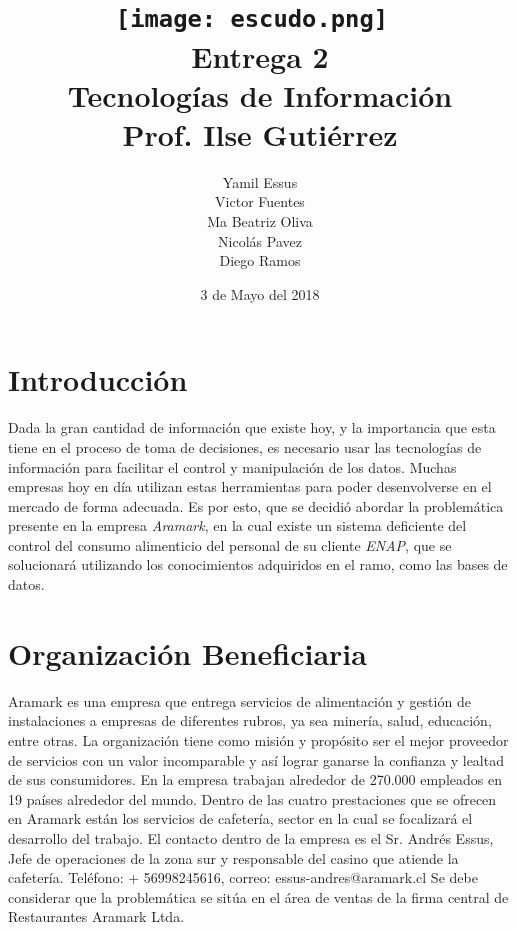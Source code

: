 \documentclass[12pt]{article}
\title{\texttt{[image: escudo.png]}~ 
\\[1cm]Entrega 2\\Tecnolog\'ias de Informaci\'on\\Prof. Ilse Guti\'errez}
\author{Yamil Essus\\Victor Fuentes\\ Ma Beatriz Oliva\\Nicol\'as Pavez\\Diego Ramos}
\date{3 de Mayo del 2018}
\begin{document}
	\maketitle
	\newpage
	\section{Introducci\'on}
	Dada la gran cantidad de informaci\'on que existe hoy, y la importancia que esta tiene en el proceso de toma de decisiones, es necesario usar las tecnolog\'ias de informaci\'on para facilitar el control y manipulaci\'on de los datos. Muchas empresas hoy en d\'ia utilizan estas herramientas para poder desenvolverse en el mercado de forma adecuada. Es por esto, que se decidi\'o abordar la problem\'atica presente en la empresa \textit{Aramark}, en la cual existe un sistema deficiente del control del consumo alimenticio del personal de su cliente \textit{ENAP}, que se solucionar\'a utilizando los conocimientos adquiridos en el ramo, como las bases de datos. 
	\section{Organizaci\'on Beneficiaria}
	Aramark es una empresa que entrega servicios de alimentaci\'on y gesti\'on de instalaciones a empresas de diferentes rubros, ya sea miner\'ia, salud, educaci\'on, entre otras. 
La organizaci\'on tiene como misi\'on y prop\'osito ser el mejor proveedor de servicios con un valor incomparable y as\'i lograr ganarse la confianza y lealtad de sus consumidores. 
En la empresa trabajan alrededor de 270.000 empleados en 19 pa\'ises alrededor del mundo.
Dentro de las cuatro prestaciones que se ofrecen en Aramark est\'an los servicios de cafeter\'ia, sector en la cual se focalizar\'a el desarrollo del trabajo. 
El contacto dentro de la empresa es el Sr. Andr\'es Essus, Jefe de operaciones de la zona sur y responsable del casino que atiende la cafeter\'ia. Tel\'efono: + 56998245616, correo: essus-andres@aramark.cl
Se debe considerar que la problem\'atica se sit\'ua en el \'area de ventas de la firma central de Restaurantes Aramark Ltda.  

	\newpage
\end{document}

